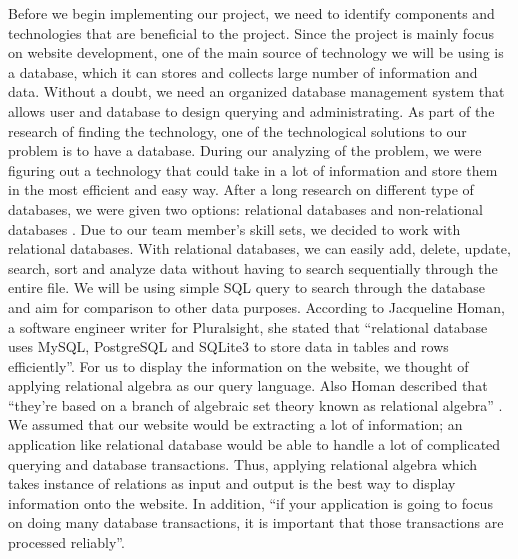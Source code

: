 \documentclass[letterpaper,10pt, draftclsnofoot,onecolumn]{IEEEtran}
\begin{document}
{{{\color{black}\normalsize\noindent
{Before we begin implementing our project, we need to identify components and technologies that are beneficial to the project. 
Since the project is mainly focus on website development, one of the main source of technology we will be using is a database, which it can stores and collects large number of information and data.
Without a doubt, we need an organized database management system that allows user and database to design querying and administrating.
As part of the research of finding the technology, one of the technological solutions to our problem is to have a database. 
During our analyzing of the problem, we were figuring out a technology that could take in a lot of information and store them in the most efficient and easy way. 
After a long research on different type of databases, we were given two options: relational databases and non-relational databases \cite{IEEEexample:article}. 
Due to our team member’s skill sets, we decided to work with relational databases. 
With relational databases, we can easily add, delete, update, search, sort and analyze data without having to search sequentially through the entire file.
We will be using simple SQL query to search through the database and aim for comparison to other data purposes. 
According to Jacqueline Homan, a software engineer writer for Pluralsight, she stated that “relational database uses MySQL, PostgreSQL and SQLite3 to store data in tables and rows efficiently”\cite{IEEEexample:article}. 
For us to display the information on the website, we thought of applying relational algebra as our query language.
Also Homan described that “they’re based on a branch of algebraic set theory known as relational algebra” \cite{IEEEexample:article}. 
We assumed that our website would be extracting a lot of information; an application like relational database would be able to handle a lot of complicated querying and database transactions. 
Thus, applying relational algebra which takes instance of relations as input and output is the best way to display information onto the website. 
In addition, “if your application is going to focus on doing many database transactions, it is important that those transactions are processed reliably”. \cite{IEEEexample:article} 
}

}}}
\end{document}

